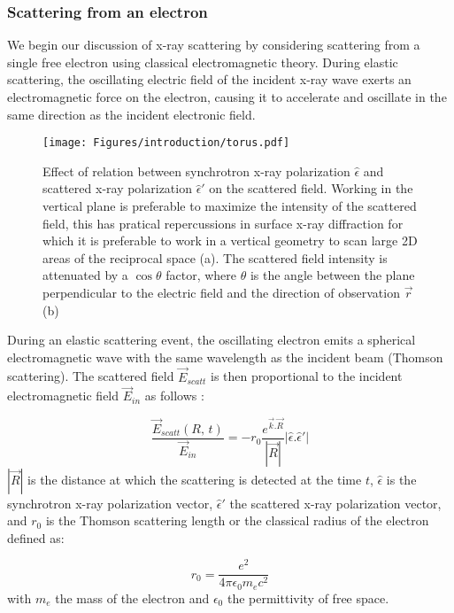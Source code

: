 \subsubsection{Scattering from an electron}

We begin our discussion of x-ray scattering by considering scattering from a single free electron using classical electromagnetic theory.
During elastic scattering, the oscillating electric field of the incident x-ray wave exerts an electromagnetic force on the electron, causing it to accelerate and oscillate in the same direction as the incident electronic field.

\begin{figure}[!htb]
    \centering
    \texttt{[image: Figures/introduction/torus.pdf]}
    \caption{
        Effect of relation between synchrotron x-ray polarization $\hat{\epsilon}$ and scattered x-ray polarization $\hat{\epsilon}'$ on the scattered field.
        Working in the vertical plane is preferable to maximize the intensity of the scattered field, this has pratical repercussions in surface x-ray diffraction for which it is preferable to work in a vertical geometry to scan large 2D areas of the reciprocal space (a).
        The scattered field intensity is attenuated by a $\cos{\theta}$ factor, where $\theta$ is the angle between the plane perpendicular to the electric field and the direction of observation $\vec{r}$ (b)
    }
    \label{fig:polarization_effect}
\end{figure}

During an elastic scattering event, the oscillating electron emits a spherical electromagnetic wave with the same wavelength as the incident beam (Thomson scattering).
The scattered field $\vec{E}_{scatt}$ is then proportional to the incident electromagnetic field $\vec{E}_{in}$ as follows \parencite{NielsenMcMorrow}:

\begin{equation}
    \label{eq:scatt_field}
    \frac{\vec{E}_{scatt}(R, \, t)} {\vec{E}_{in}} = -r_0 \frac{e^{\vec{k}.\vec{R}}} {|\vec{R}|}| \hat{\epsilon}.\hat{\epsilon}'|
\end{equation}
$|\vec{R}|$ is the distance at which the scattering is detected at the time $t$, $\hat{\epsilon}$ is the synchrotron x-ray polarization vector, $\hat{\epsilon}'$ the scattered x-ray polarization vector, and $r_0$ is the Thomson scattering length or the classical radius of the electron defined as:

\begin{equation}
    \label{eq:scatt_thomson_scat_length}
    r_0 = \frac{e^2} {4\pi\epsilon_0 m_e c^2}
\end{equation}
with $m_e$ the mass of the electron and $\epsilon_0$ the permittivity of free space.

